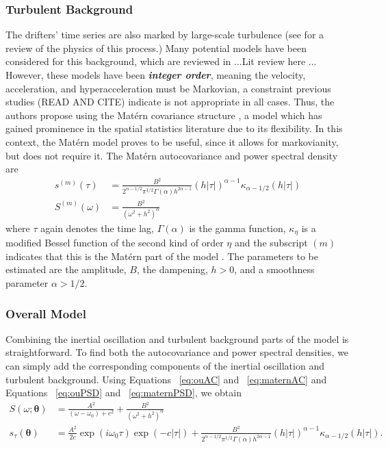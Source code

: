 \documentclass{stat572Style}
\begin{document}
\subsubsection{Turbulent Background}
The drifters' time series are also marked by large-scale turbulence (see \citet{Rhines1979} for a review of the physics of this process.) Many potential models have been considered for this background, which are reviewed in \citep{Lacasce2008} ...Lit review here ... However, these models have been \textbf{\it{integer order}}, meaning the velocity, acceleration, and hyperacceleration must be Markovian, a constraint previous studies (READ AND CITE) indicate is not appropriate in all cases. Thus, the authors propose using the Mat\'{e}rn covariance structure \citep{Gneiting2012}, a model which has gained prominence in the spatial statistics literature due to its flexibility. In this context, the Mat\'{e}rn model proves to be useful, since it allows for markovianity, but does not require it.  The Mat\'{e}rn  autocovariance and power spectral density are
\begin{align}
\label{eq:maternAC}
s^{(m)}(\tau) &= \frac{B^{2}}{2^{\alpha - 1/2}\pi^{1/2} \Gamma(\alpha) h^{2 \alpha - 1}}(h|\tau|)^{\alpha - 1}\kappa_{\alpha - 1/2}(h|\tau|)\\
\label{eq:maternPSD}
S^{(m)}(\omega) &= \frac{B^{2}}{(\omega^{2} + h^{2})^{\alpha}}
\end{align}
where $\tau$ again denotes the time lag, $\Gamma(\alpha)$ is the gamma function,  $\kappa_{\eta}$ is a modified Bessel function of the second kind of order $\eta$  and the subscript $(m)$ indicates that this is the Mat\'{e}rn part of the model \citep{Stein2012}. The parameters to be estimated are the amplitude, $B$, the dampening, $h > 0$, and a smoothness parameter $\alpha > 1/2$. 

\subsubsection{Overall Model}
Combining the inertial oscillation and turbulent background parts of the model is straightforward. To find both the autocovariance and power spectral densities, we can simply add the corresponding components of the inertial oscillation and turbulent background. Using Equations ~\ref{eq:ouAC} and ~\ref{eq:maternAC} and Equations ~\ref{eq:ouPSD} and ~\ref{eq:maternPSD}, we obtain
\begin{align}
S(\omega; \boldsymbol{\theta}) &= \frac{A^{2}}{(\omega - \omega_{0}) + c^{2}} + \frac{B^{2}}{(\omega^{2} + h^{2})^{\alpha}}\\
\label{eq: fullSpec}
s_{\tau}(\boldsymbol{\theta}) &= \frac{A^{2}}{2c} \exp(i \omega_{0}\tau) \exp(-c|\tau|) +  \frac{B^{2}}{2^{\alpha - 1/2}\pi^{1/2} \Gamma(\alpha) h^{2 \alpha - 1}}(h|\tau|)^{\alpha - 1}\kappa_{\alpha - 1/2}(h|\tau|).
\end{align}
\end{document}
